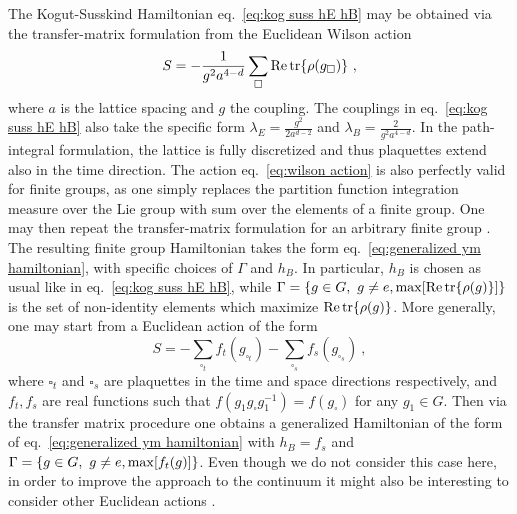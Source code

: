 The Kogut-Susskind Hamiltonian eq.~\eqref{eq:kog suss hE hB} may be obtained via the transfer-matrix formulation from the Euclidean Wilson action \cite{creutz1977transfermatrix,KogRev}
\begin{equation}
    \label{eq:wilson action}
    S = -\frac{1}{g^2 a^{4-d}} \sum_{\square} \Re \tr{\rho(g_\square)} \ ,
\end{equation}
where $a$ is the lattice spacing and $g$ the coupling.
The couplings in  eq.~\eqref{eq:kog suss hE hB} also take the specific form $\lambda_E = \frac{g^2}{2a^{d-2}}$ and $\lambda_B = \frac{2}{g^2 a^{4-d}}$.
In the path-integral formulation, the lattice is fully discretized and thus plaquettes extend also in the time direction.
The action eq.~\eqref{eq:wilson action} is also perfectly valid for finite groups, as one simply replaces the partition function integration measure over the Lie group with sum over the elements of a finite group.
One may then repeat the transfer-matrix formulation for an arbitrary finite group \cite{TransferMatrixFiniteGroup}.
The resulting finite group Hamiltonian takes the form eq.~\eqref{eq:generalized ym hamiltonian}, with specific choices of $\Gamma$ and $h_B$.
In particular, $h_B$ is chosen as usual like in eq.~\eqref{eq:kog suss hE hB}, while $\Gamma = \{g \in G,\,\, g \neq e, \mathrm{max} \bqty{\Re \tr{\rho(g)}}  \}$ is the set of non-identity elements which maximize $\Re \tr{\rho(g)}$.
More generally, one may start from a Euclidean action of the form
\begin{equation}
    \label{eq:anisotropic action}
    S = -\sum_{\square_t} f_t(g_{\square_t}) - \sum_{\square_s} f_s(g_{\square_s}) \ ,
\end{equation}
where $\square_t$ and $\square_s$ are plaquettes in the time and space directions respectively, and $f_t, f_s$ are real functions such that $f(g_1 g_\square g_1^{-1})=f(g_\square)$ for any $g_1 \in G$.
Then via the transfer matrix procedure one obtains a generalized Hamiltonian of the form of eq.~\eqref{eq:generalized ym hamiltonian} with $h_B = f_s$ and $\Gamma = \{g \in G,\,\, g \neq e, \mathrm{max} \bqty{f_t(g)} \}$.
Even though we do not consider this case here, in order to improve the approach to the continuum it might also be interesting to consider other Euclidean actions \cite{Hasenfratz1,LammChairs}.

